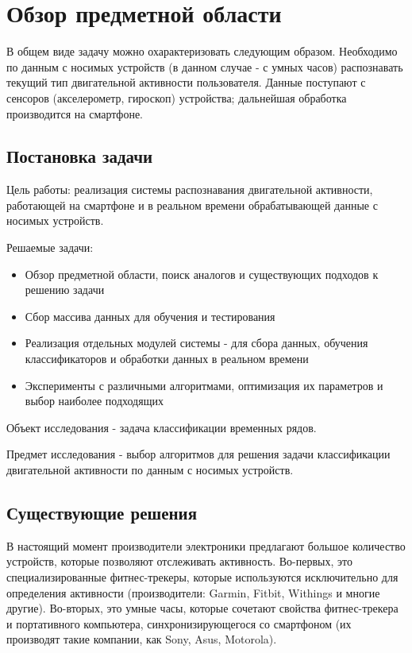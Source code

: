 \chapter{Обзор предметной области}

В общем виде задачу можно охарактеризовать следующим образом. Необходимо по данным с носимых устройств (в данном случае - с умных часов) распознавать текущий тип двигательной активности пользователя. Данные поступают с сенсоров (акселерометр, гироскоп) устройства; дальнейшая обработка производится на смартфоне. 

\section{Постановка задачи}

Цель работы: реализация системы распознавания двигательной активности, работающей на смартфоне и в реальном времени обрабатывающей данные с носимых устройств.

Решаемые задачи:
\begin{itemize}
\item Обзор предметной области, поиск аналогов и существующих подходов к решению задачи
\item Сбор массива данных для обучения и тестирования
\item Реализация отдельных модулей системы - для сбора данных, обучения классификаторов и обработки данных в реальном времени
\item Эксперименты с различными алгоритмами, оптимизация их параметров и выбор наиболее подходящих
\end{itemize}

Объект исследования - задача классификации временных рядов.

Предмет исследования - выбор алгоритмов для решения задачи классификации двигательной активности по данным с носимых устройств. 

\section{Существующие решения}

В настоящий момент производители электроники предлагают большое количество устройств, которые позволяют отслеживать активность. Во-первых, это специализированные фитнес-трекеры, которые используются исключительно для определения активности (производители: Garmin, Fitbit, Withings и многие другие). Во-вторых, это умные часы, которые сочетают свойства фитнес-трекера и портативного компьютера, синхронизирующегося со смартфоном (их производят такие компании, как Sony, Asus, Motorola). 

